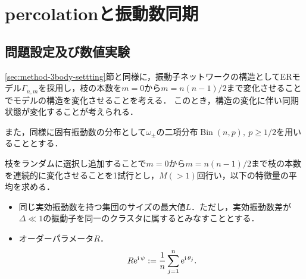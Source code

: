 \documentclass[../main]{subfiles}
\begin{document}
\chapter{percolationと振動数同期}
\label{chap:percolation}
\section{問題設定及び数値実験}
\ref{sec:method-3body-settting}節と同様に，振動子ネットワークの構造としてERモデル$\Gamma_{n,m}$を採用し，枝の本数を$m=0$から$m=n(n-1)/2$まで変化させることでモデルの構造を変化させることを考える．
このとき，構造の変化に伴い同期状態が変化することが考えられる．

また，同様に固有振動数の分布として$\omega_\pm$の二項分布$\operatorname{Bin}(n,p),\ p\geq 1/2$を用いることとする．

枝をランダムに選択し追加することで$m=0$から$m=n(n-1)/2$まで枝の本数を連続的に変化させることを1試行とし，$M(>1)$回行い，以下の特徴量の平均を求める．
\begin{itemize}
    \item 
    同じ実効振動数を持つ集団のサイズの最大値$L$．ただし，実効振動数差が$\Delta\ll 1$の振動子を同一のクラスタに属するとみなすこととする．
    \item
    オーダーパラメータ$R$．
    \begin{align*}
        R\mathrm{e}^{{\mathrm i\,} \psi}:=\frac{1}{n}\sum_{j=1}^n\mathrm{e}^{{\mathrm i\,} \theta_j}.    
    \end{align*}
\end{itemize}
\end{document}

